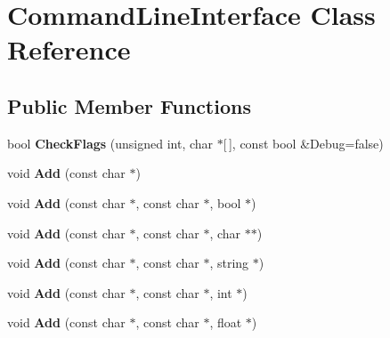 \hypertarget{class_command_line_interface}{}\section{Command\+Line\+Interface Class Reference}
\label{class_command_line_interface}
\subsection*{Public Member Functions}
\begin{DoxyCompactItemize}
\item 
\mbox{\label{class_command_line_interface_a1f6bfeecf308188d8dc222055953e18e}} 
bool {\bfseries Check\+Flags} (unsigned int, char $\ast$\mbox{[}$\,$\mbox{]}, const bool \&Debug=false)
\item 
\mbox{\label{class_command_line_interface_a7c2c2753fa255f169868cda2427dca09}} 
void {\bfseries Add} (const char $\ast$)
\item 
\mbox{\label{class_command_line_interface_afe887dcf7bffc5db0df310acc30a1b06}} 
void {\bfseries Add} (const char $\ast$, const char $\ast$, bool $\ast$)
\item 
\mbox{\label{class_command_line_interface_aca53dd3b265ef8a1a7fac0965cedebf6}} 
void {\bfseries Add} (const char $\ast$, const char $\ast$, char $\ast$$\ast$)
\item 
\mbox{\label{class_command_line_interface_a3b992aa230379d9e8afd3b49be1a490b}} 
void {\bfseries Add} (const char $\ast$, const char $\ast$, string $\ast$)
\item 
\mbox{\label{class_command_line_interface_ada6bf74ec394e7ce7530825ff5ef430d}} 
void {\bfseries Add} (const char $\ast$, const char $\ast$, int $\ast$)
\item 
\mbox{\label{class_command_line_interface_a14facf6d693ab997a3064af9370b8d6d}} 
void {\bfseries Add} (const char $\ast$, const char $\ast$, float $\ast$)
\item 
\mbox{\label{class_command_line_interface_abba0b896dbb68622c38ac7a9d5edcc75}} 
$$
\end{DoxyCompactItemize}

